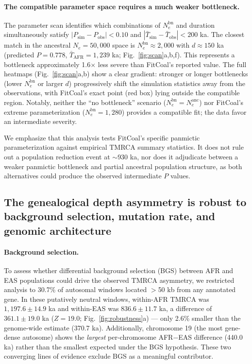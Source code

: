 \paragraph{The compatible parameter space requires a much weaker bottleneck.}
The parameter scan identifies which combinations of $N_e^{\text{bn}}$ and duration simultaneously satisfy $|P_\text{sim} - P_\text{obs}| < 0.10$ and $|\bar{T}_\text{sim} - \bar{T}_\text{obs}| < 200$ ka. The closest match in the ancestral $N_e = 50{,}000$ space is $N_e^{\text{bn}} \approx 2{,}000$ with $d \approx 150$ ka (predicted $P = 0.778$, $\bar{T}_\text{AFR} = 1{,}239$ ka; Fig.~\ref{fig:scan}a,b,f). This represents a bottleneck approximately 1.6$\times$ less severe than FitCoal's reported value. The full heatmaps (Fig.~\ref{fig:scan}a,b) show a clear gradient: stronger or longer bottlenecks (lower $N_e^{\text{bn}}$ or larger $d$) progressively shift the simulation statistics away from the observations, with FitCoal's exact point (red box) lying outside the compatible region. Notably, neither the ``no bottleneck'' scenario ($N_e^{\text{bn}} = N_e^{\text{anc}}$) nor FitCoal's extreme parameterization ($N_e^{\text{bn}} = 1{,}280$) provides a compatible fit; the data favor an intermediate severity.

We emphasize that this analysis tests FitCoal's specific panmictic parameterization against empirical TMRCA summary statistics. It does not rule out a population reduction event at $\sim$930 ka, nor does it adjudicate between a weaker panmictic bottleneck and partial ancestral population structure, as both alternatives could produce the observed intermediate $P$ values.

\subsection*{The genealogical depth asymmetry is robust to background selection, mutation rate, and genomic architecture}

\paragraph{Background selection.}
To assess whether differential background selection (BGS) between AFR and EAS populations could drive the observed TMRCA asymmetry, we restricted analysis to 30.7\% of autosomal windows located $>$50 kb from any annotated gene. In these putatively neutral windows, within-AFR TMRCA was $1{,}197.6 \pm 14.9$ ka and within-EAS was $836.6 \pm 11.7$ ka, a difference of $361.1 \pm 19.0$ ka ($Z = 19.0$; Fig.~\ref{fig:robustness}a) --- only 2.6\% smaller than the genome-wide estimate (370.7 ka). Additionally, chromosome 19 (the most gene-dense autosome) shows the \textit{largest} per-chromosome AFR$-$EAS difference (440.0 ka) rather than the smallest expected under the BGS hypothesis. These two converging lines of evidence exclude BGS as a meaningful contributor.

